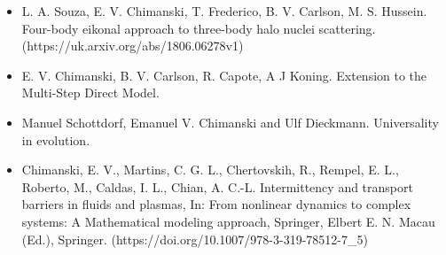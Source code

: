 \documentclass[12pt,a4paper,sans]{moderncv}
\begin{document}
{
  \begin{itemize}
  \item L. A. Souza, E. V. Chimanski, T. Frederico, B. V. Carlson, M. S. Hussein. Four-body eikonal approach to three-body halo nuclei scattering. (https://uk.arxiv.org/abs/1806.06278v1)
  \item E. V. Chimanski, B. V. Carlson, R. Capote, A J Koning. Extension to the Multi-Step Direct Model. 
  \item Manuel Schottdorf, Emanuel V. Chimanski and Ulf Dieckmann. Universality in evolution.
  \end{itemize}
}




{
	\begin{itemize}
        \item Chimanski, E. V., Martins, C. G. L., Chertovskih, R., Rempel, E. L., Roberto, M., Caldas, I. L., Chian, A. C.-L. Intermittency and transport barriers in fluids and plasmas, In: From nonlinear dynamics to complex systems: A Mathematical modeling approach, Springer, Elbert E. N. Macau (Ed.), Springer. (https://doi.org/10.1007/978-3-319-78512-7\_5)
        \end{itemize}
}
\end{document}
